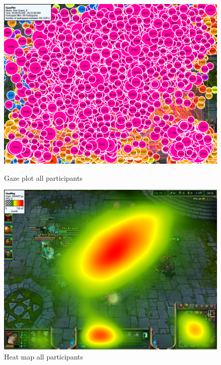 \documentclass{report}
\begin{document}
\begin{figure}[ht]
\begin{minipage}[b]{0.45\linewidth}
\centering
\includegraphics[width=\textwidth]{images/gazeplot/All}
\caption{Gaze plot all participants}
\label{gaze_all}
\end{minipage}
\hspace{0.5cm}
\begin{minipage}[b]{0.45\linewidth}
\centering
\includegraphics[width=\textwidth]{images/heatmap/All}
\caption{Heat map all participants}
\label{heat_all}
\end{minipage}
\end{figure}
\end{document}
